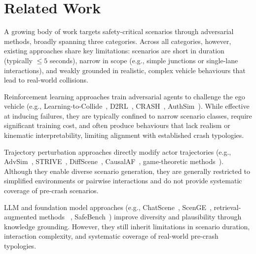\section{Related Work}

A growing body of work targets safety-critical scenarios through adversarial methods, broadly spanning three categories. Across all categories, however, existing approaches share key limitations: scenarios are short in duration (typically $\leq5$ seconds), narrow in scope (e.g., simple junctions or single-lane interactions), and weakly grounded in realistic, complex vehicle behaviours that lead to real-world collisions.

Reinforcement learning approaches train adversarial agents to challenge the ego vehicle (e.g., Learning-to-Collide~\cite{ding_learning_2020}, D2RL~\cite{feng_dense_2023}, CRASH~\cite{kulkarni_crash_2024}, AuthSim~\cite{yang_authsim_2025}). While effective at inducing failures, they are typically confined to narrow scenario classes, require significant training cost, and often produce behaviours that lack realism or kinematic interpretability, limiting alignment with established crash typologies.

Trajectory perturbation approaches directly modify actor trajectories (e.g., AdvSim~\cite{wang_advsim_2023}, STRIVE~\cite{rempe_generating_2022}, DiffScene~\cite{xu_diffscene_2025}, CausalAF~\cite{ding_causalaf_2023}, game-theoretic methods~\cite{lin_scenario-based_2025}). Although they enable diverse scenario generation, they are generally restricted to simplified environments or pairwise interactions and do not provide systematic coverage of pre-crash scenarios.

LLM and foundation model approaches (e.g., ChatScene~\cite{zhang_chatscene_2024}, ScenGE~\cite{liu_adversarial_2025}, retrieval-augmented methods~\cite{mei_seeking_2025} , SafeBench~\cite{xu_safebench_2022}) improve diversity and plausibility through knowledge grounding. However, they still inherit limitations in scenario duration, interaction complexity, and systematic coverage of real-world pre-crash typologies.